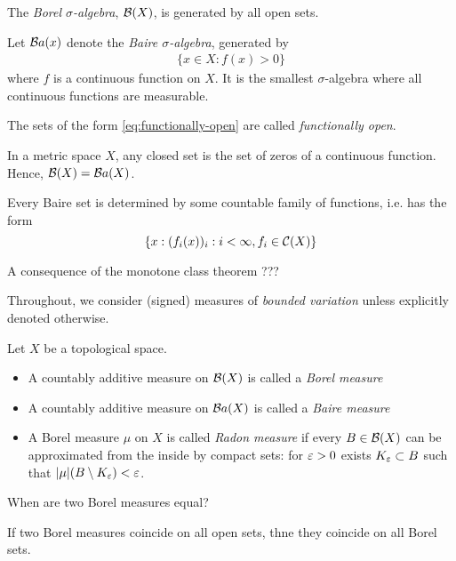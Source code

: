 The \emph{Borel $\sigma$-algebra}, $\mathcal{B}(X)$, is generated by all
open sets.

Let $\mathcal{B} a(x)$ denote the \emph{Baire $\sigma$-algebra}, generated by
\begin{align}
  \label{eq:functionally-open}
  \{x \in X : f(x) > 0 \}
\end{align}
where $f$ is a continuous function on $X$.
It is the smallest $\sigma$-algebra where all continuous
functions are measurable.

The sets of the form \cref{eq:functionally-open} are called
\emph{functionally open}.

\begin{lemma}
  In a metric space $X$, any closed set is the set of zeros of a continuous
  function. Hence, $\mathcal{B}(X) = \mathcal{B} a(X)$.
\end{lemma}

\begin{lemma}
  Every Baire set is determined by some countable
  family of functions, i.e. has the form
  \[
    \{x : (f_i(x))_i : i < \infty, f_i \in \mathcal{C}(X) \}
  \]
\end{lemma}

A consequence of the monotone class theorem ???

Throughout, we consider (signed) measures of \emph{bounded variation}
unless explicitly denoted otherwise.

\begin{definition}
  Let $X$ be a topological space.
  \begin{itemize}
    \item A countably additive measure on $\mathcal{B}(X)$ is called a
      \emph{Borel measure}
    \item A countably additive measure on $\mathcal{B} a(X)$ is called a
      \emph{Baire measure}
    \item A Borel measure $\mu$ on $X$ is called \emph{Radon measure}
      if every $B \in \mathcal{B}(X)$ can be approximated from the inside
      by compact sets: for $\varepsilon > 0$ exists $K_\varepsilon \subset B$
      such that $\lvert \mu \rvert(B \setminus K_\varepsilon) < \varepsilon$.
  \end{itemize}
\end{definition}

When are two Borel measures equal?
\begin{lemma}
  If two Borel measures coincide on all open sets, thne they
  coincide on all Borel sets.
\end{lemma}

